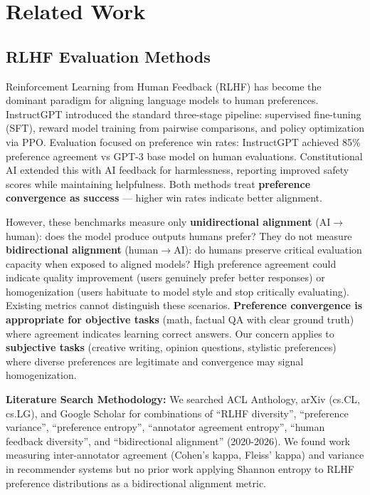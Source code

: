 \section{Related Work}

\subsection{RLHF Evaluation Methods}

Reinforcement Learning from Human Feedback (RLHF) has become the dominant paradigm for aligning language models to human preferences. InstructGPT \cite{ouyang2022instructgpt} introduced the standard three-stage pipeline: supervised fine-tuning (SFT), reward model training from pairwise comparisons, and policy optimization via PPO. Evaluation focused on preference win rates: InstructGPT achieved 85\% preference agreement vs GPT-3 base model on human evaluations. Constitutional AI \cite{bai2022constitutional} extended this with AI feedback for harmlessness, reporting improved safety scores while maintaining helpfulness. Both methods treat \textbf{preference convergence as success} — higher win rates indicate better alignment.

However, these benchmarks measure only \textbf{unidirectional alignment} (AI$\rightarrow$human): does the model produce outputs humans prefer? They do not measure \textbf{bidirectional alignment} (human$\rightarrow$AI): do humans preserve critical evaluation capacity when exposed to aligned models? High preference agreement could indicate quality improvement (users genuinely prefer better responses) or homogenization (users habituate to model style and stop critically evaluating). Existing metrics cannot distinguish these scenarios. \textbf{Preference convergence is appropriate for objective tasks} (math, factual QA with clear ground truth) where agreement indicates learning correct answers. Our concern applies to \textbf{subjective tasks} (creative writing, opinion questions, stylistic preferences) where diverse preferences are legitimate and convergence may signal homogenization.

\textbf{Literature Search Methodology:} We searched ACL Anthology, arXiv (cs.CL, cs.LG), and Google Scholar for combinations of ``RLHF diversity'', ``preference variance'', ``preference entropy'', ``annotator agreement entropy'', ``human feedback diversity'', and ``bidirectional alignment'' (2020-2026). We found work measuring inter-annotator agreement (Cohen's kappa, Fleiss' kappa) and variance in recommender systems but no prior work applying Shannon entropy to RLHF preference distributions as a bidirectional alignment metric.

